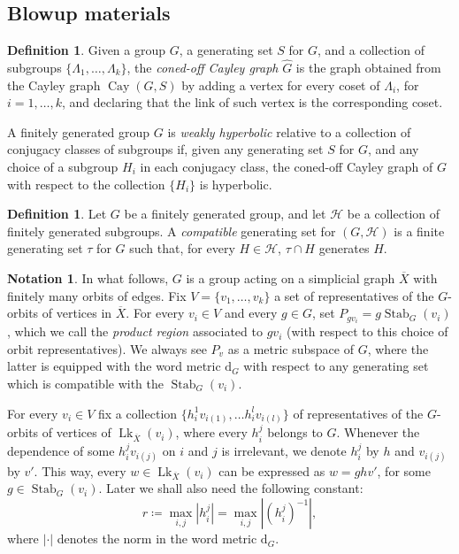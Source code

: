 \documentclass[svgnames]{amsart}
\theoremstyle{plain}
\theoremstyle{definition}
\newtheorem{defn}[thm]{Definition}
\newtheorem{notation}[thm]{Notation}
\newcommand{\Cay}[2]{\operatorname{Cay}\left(#1,#2\right)}
\newcommand{\ov}[1]{\overline{#1}}
\newcommand{\dist}{\mathrm{d}}
\newcommand{\link}{\operatorname{Lk}}
\newcommand{\Stab}[2]{\operatorname{Stab}_{#1}(#2)}
\newcommand{\h}{\widehat}
\begin{document}
\subsection{Blowup materials}

\begin{defn}\label{defn:weak_hyp}
    Given a group $G$, a generating set $S$ for $G$, and a collection of subgroups $\{\Lambda_1,\ldots, \Lambda_k\}$, the \emph{coned-off Cayley graph} $\h G$ is the graph obtained from the Cayley graph $\Cay{G}{S}$ by adding a vertex for every coset of $\Lambda_i$, for $i=1,\ldots, k$, and declaring that the link of such vertex is the corresponding coset. 
    
    A finitely generated group $G$ is \emph{weakly hyperbolic} relative to a collection  of conjugacy classes of subgroups if, given any generating set $S$ for $G$, and any choice of a subgroup $H_i$ in each conjugacy class, the coned-off Cayley graph of $G$ with respect to the collection $\{H_i\}$ is hyperbolic.
\end{defn}


\begin{defn}
    Let $G$ be a finitely generated group, and let $\mathcal{H}$ be a collection of finitely generated subgroups. A \emph{compatible} generating set for $(G,\mathcal{H})$ is a finite generating set $\tau$ for $G$ such that, for every $H\in \mathcal{H}$, $\tau\cap H$ generates $H$. 
\end{defn}


\begin{notation}\label{notation:pre_def_squid}
In what follows, $G$ is a group acting on a simplicial graph $\ov X$ with finitely many orbits of edges. Fix $V=\{v_1,\ldots, v_k\}$ a set of representatives of the $G$-orbits of vertices in $\ov{X}$. For every $v_i\in V$ and every $g\in G$, set $P_{gv_i}=g\Stab{G}{v_i}$, which we call the \emph{product region} associated to $gv_i$ (with respect to this choice of orbit representatives). We always see $P_v$ as a metric subspace of $G$, where the latter is equipped with the word metric $\dist_G$ with respect to any generating set which is compatible with the $\Stab{G}{v_i}$. 

For every $v_i\in V$ fix a collection $\{h_i^1 v_{i(1)}, \ldots h_i^l v_{i(l)}\}$ of representatives of the $G$-orbits of vertices of $\link_{\ov X}(v_i)$, where every $h_i^j$ belongs to $G$. Whenever the dependence of some $h_i^j v_{i(j)}$ on $i$ and $j$ is irrelevant, we denote $h_i^j$ by $h$ and $v_{i(j)}$ by $v'$. This way, every $w\in\link_{\ov X}(v_i)$ can be expressed as $w=ghv'$, for some $g\in \Stab{G}{v_i}$. Later we shall also need the following constant: $$r\coloneq\max_{i,j}\left|h_i^j\right|=\max_{i,j}\left|(h_i^j)^{-1}\right|,$$ where $|\cdot|$ denotes the norm in the word metric $\dist_G$.
\end{notation}
\end{document}
